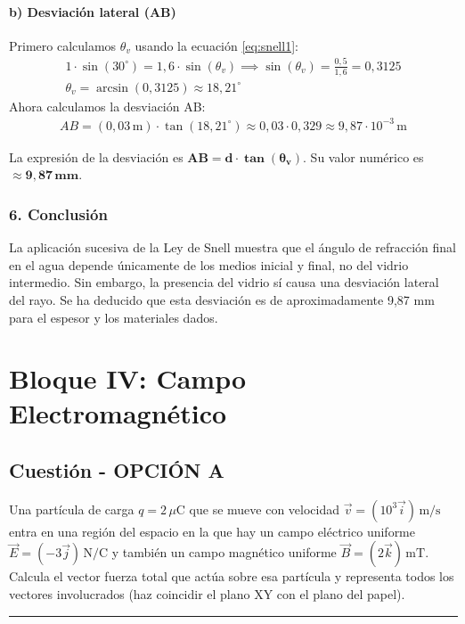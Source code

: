 \paragraph*{b) Desviación lateral (AB)}
Primero calculamos $\theta_v$ usando la ecuación \eqref{eq:snell1}:
\begin{gather}
    1 \cdot \sin(30^\circ) = 1,6 \cdot \sin(\theta_v) \implies \sin(\theta_v) = \frac{0,5}{1,6} = 0,3125 \\
    \theta_v = \arcsin(0,3125) \approx 18,21^\circ
\end{gather}
Ahora calculamos la desviación AB:
\begin{gather}
    AB = (0,03\,\text{m}) \cdot \tan(18,21^\circ) \approx 0,03 \cdot 0,329 \approx 9,87 \cdot 10^{-3}\,\text{m}
\end{gather}
\begin{cajaresultado}
    La expresión de la desviación es $\boldsymbol{AB = d \cdot \tan(\theta_v)}$. Su valor numérico es $\boldsymbol{\approx 9,87\,\textbf{mm}}$.
\end{cajaresultado}

\subsubsection*{6. Conclusión}
\begin{cajaconclusion}
La aplicación sucesiva de la Ley de Snell muestra que el ángulo de refracción final en el agua depende únicamente de los medios inicial y final, no del vidrio intermedio. Sin embargo, la presencia del vidrio sí causa una desviación lateral del rayo. Se ha deducido que esta desviación es de aproximadamente 9,87 mm para el espesor y los materiales dados.
\end{cajaconclusion}

\newpage
\section{Bloque IV: Campo Electromagnético}
\label{sec:em_2012_sep}

\subsection{Cuestión - OPCIÓN A}
\label{subsec:IVA_2012_sep}

\begin{cajaenunciado}
Una partícula de carga $q=2\,\mu\text{C}$ que se mueve con velocidad $\vec{v}=(10^3\vec{i})\,\text{m/s}$ entra en una región del espacio en la que hay un campo eléctrico uniforme $\vec{E}=(-3\vec{j})\,\text{N/C}$ y también un campo magnético uniforme $\vec{B}=(2\vec{k})\,\text{mT}$. Calcula el vector fuerza total que actúa sobre esa partícula y representa todos los vectores involucrados (haz coincidir el plano XY con el plano del papel).
\end{cajaenunciado}
\hrule

